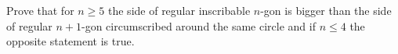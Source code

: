 Prove that for $n\ge5$ the side of regular inscribable $n$-gon is bigger than the side of regular $n+1$-gon circumscribed around the same circle and if $n\le4$ the opposite statement is true.